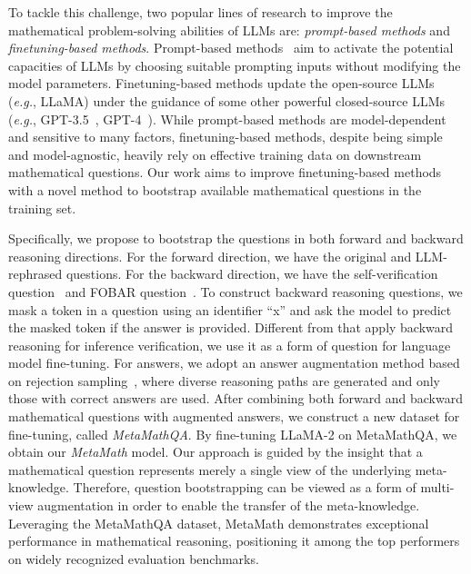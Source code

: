     To tackle this challenge, two popular lines of research to improve the mathematical problem-solving abilities of LLMs are: \emph{prompt-based methods} and \emph{finetuning-based methods}. Prompt-based methods~\cite{wei2022chain,fu2023complexitybased,wang2023selfconsistency,zhou2023leasttomost,xiong2023dq,xin2023lego} aim to activate the potential capacities of LLMs by choosing suitable prompting inputs without modifying the model parameters. Finetuning-based methods update the open-source LLMs (\emph{e.g.}, LLaMA) under the guidance of some other powerful closed-source LLMs (\emph{e.g.}, GPT-3.5~\cite{gpt3-5}, GPT-4~\cite{gpt4}). While prompt-based methods are model-dependent and sensitive to many factors, finetuning-based methods, despite being simple and model-agnostic, heavily rely on effective training data on downstream mathematical questions. Our work aims to improve finetuning-based methods with a novel method to bootstrap available mathematical questions in the training set. 

    Specifically, we propose to bootstrap the questions in both forward and backward reasoning directions. For the forward direction, we have the original and LLM-rephrased questions. For the backward direction, we have the self-verification question~\cite{weng2023large} and FOBAR question~\cite{jiang2023backward}. To construct backward reasoning questions, we mask a token in a question using an identifier ``x'' and ask the model to predict the masked token if the answer is provided. Different from \cite{weng2023large,jiang2023backward} that apply backward reasoning for inference verification, we use it as a form of question for language model fine-tuning. For answers, we adopt an answer augmentation method based on rejection sampling~\cite{yuan2023scaling}, where diverse reasoning paths are generated and only those with correct answers are used. After combining both forward and backward mathematical questions with augmented answers, we construct a new dataset for fine-tuning, called \emph{MetaMathQA}. By fine-tuning LLaMA-2 on MetaMathQA, we obtain our \emph{MetaMath} model. Our approach is guided by the insight that a mathematical question represents merely a single view of the underlying meta-knowledge. Therefore, question bootstrapping can be viewed as a form of multi-view augmentation in order to enable the transfer of the meta-knowledge. Leveraging the MetaMathQA dataset, MetaMath demonstrates exceptional performance in mathematical reasoning, positioning it among the top performers on widely recognized evaluation benchmarks.


